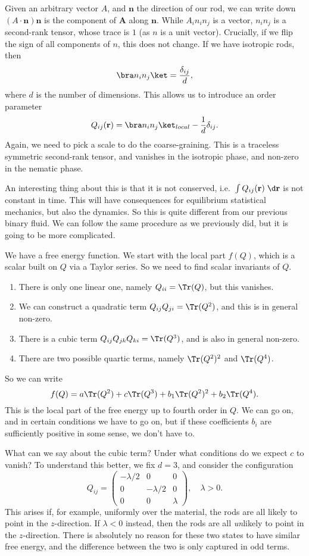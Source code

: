 \documentclass[a4paper]{article}
\begin{document}
Given an arbitrary vector $A$, and $\mathbf{n}$ the direction of our rod, we can write down $(A \cdot \mathbf{n}) \mathbf{n}$ is the component of $\mathbf{A}$ along $\mathbf{n}$. While $A_i n_i n_j$ is a vector, $n_i n_j$ is a second-rank tensor, whose trace is $1$ (as $n$ is a unit vector). Crucially, if we flip the sign of all components of $n$, this does not change. If we have isotropic rods, then
\[
  \bra n_i n_j \ket = \frac{\delta_{ij}}{d},
\]
where $d$ is the number of dimensions. This allows us to introduce an order parameter
\[
  Q_{ij} (\mathbf{r}) = \bra n_i n_j\ket_{local} - \frac{1}{d} \delta_{ij}.
\]
Again, we need to pick a scale to do the coarse-graining. This is a traceless symmetric second-rank tensor, and vanishes in the isotropic phase, and non-zero in the nematic phase.

An interesting thing about this is that it is not conserved, i.e.\ $\int Q_{ij}(\mathbf{r})\;\d \mathbf{r}$ is not constant in time. This will have consequences for equilibrium statistical mechanics, but also the dynamics. So this is quite different from our previous binary fluid. We can follow the same procedure as we previously did, but it is going to be more complicated.

We have a free energy function. We start with the local part $f(Q)$, which is a scalar built on $Q$ via a Taylor series. So we need to find scalar invariants of $Q$.
\begin{enumerate}
  \item There is only one linear one, namely $Q_{ii} = \Tr(Q)$, but this vanishes.
  \item We can construct a quadratic term $Q_{ij} Q_{ji} = \Tr(Q^2)$, and this is in general non-zero.
  \item There is a cubic term $Q_{ij} Q_{jk} Q_{ki} = \Tr(Q^3)$, and is also in general non-zero.
  \item There are two possible quartic terms, namely $\Tr(Q^2)^2$ and $\Tr(Q^4)$.
\end{enumerate}
So we can write
\[
  f(Q) = a\Tr(Q^2) + c \Tr(Q^3) + b_1 \Tr(Q^2)^2 + b_2 \Tr(Q^4).
\]
This is the local part of the free energy up to fourth order in $Q$. We can go on, and in certain conditions we have to go on, but if these coefficients $b_i$ are sufficiently positive in some sense, we don't have to.

What can we say about the cubic term? Under what conditions do we expect $c$ to vanish? To understand this better, we fix $d = 3$, and consider the configuration
\[
  Q_{ij} =
  \begin{pmatrix}
    -\lambda/2 & 0 & 0\\
    0 & -\lambda/2 & 0\\
    0 & 0 & \lambda
  \end{pmatrix},\quad \lambda > 0.
\]
This arises if, for example, uniformly over the material, the rods are all likely to point in the $z$-direction. If $\lambda < 0$ instead, then the rods are all \emph{un}likely to point in the $z$-direction. There is absolutely no reason for these two states to have similar free energy, and the difference between the two is only captured in odd terms.
\end{document}
